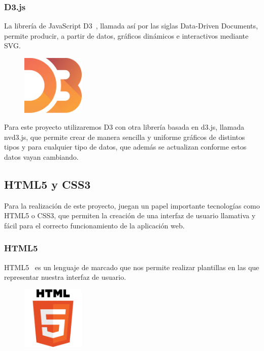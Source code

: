 \documentclass[a4paper, spanish, 12pt]{book}
\begin{document}
\subsubsection*{D3.js}
\label{subsec:d3}

La librer\'ia de JavaScript D3~\cite{d3}, llamada as\'i por las siglas Data-Driven Documents,
permite producir, a partir de datos, gr\'aficos din\'amicos e interactivos mediante SVG.

\begin{figure}[H]
  \centering
  \includegraphics[width=3cm, keepaspectratio]{img/d3-logo}
\end{figure}

Para este proyecto utilizaremos D3 con otra librer\'ia basada en d3.js, llamada nvd3.js, que permite
crear de manera sencilla y uniforme gr\'aficos de distintos tipos y para cualquier
tipo de datos, que adem\'as se actualizan conforme estos datos vayan cambiando.

\subsection{HTML5 y CSS3}
\label{subsec:html5css3}

Para la realizaci\'on de este proyecto, juegan un papel importante tecnolog\'ias
como HTML5 o CSS3, que permiten la creaci\'on de una interfaz de usuario llamativa
y f\'acil para el correcto funcionamiento de la aplicaci\'on web.

\subsubsection*{HTML5}
\label{subsec:html5}

HTML5~\cite{html5} es un lenguaje de marcado que nos permite realizar plantillas en las que
representar nuestra interfaz de usuario.

\begin{figure}[H]
  \centering
  \includegraphics[width=3cm, keepaspectratio]{img/html5-logo}
\end{figure}
\end{document}
